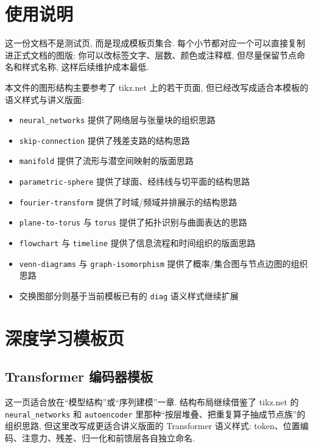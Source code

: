 \documentclass[a4paper,12pt,oneside]{maki-notes}
\begin{document}
\frontmatter
\MakeTitlePage

\chapter*{使用说明}
这一份文档不是测试页, 而是现成模板页集合. 每个小节都对应一个可以直接复制进正式文档的图版: 你可以改标签文字、层数、颜色或注释框, 但尽量保留节点命名和样式名称, 这样后续维护成本最低.

本文件的图形结构主要参考了 tikz.net 上的若干页面, 但已经改写成适合本模板的语义样式与讲义版面:
\begin{itemize}
\item \texttt{neural\_networks} 提供了网络层与张量块的组织思路
\item \texttt{skip-connection} 提供了残差支路的结构思路
\item \texttt{manifold} 提供了流形与潜空间映射的版面思路
\item \texttt{parametric-sphere} 提供了球面、经纬线与切平面的结构思路
\item \texttt{fourier-transform} 提供了时域/频域并排展示的结构思路
\item \texttt{plane-to-torus} 与 \texttt{torus} 提供了拓扑识别与曲面表达的思路
\item \texttt{flowchart} 与 \texttt{timeline} 提供了信息流程和时间组织的版面思路
\item \texttt{venn-diagrams} 与 \texttt{graph-isomorphism} 提供了概率/集合图与节点边图的组织思路
\item 交换图部分则基于当前模板已有的 \texttt{diag} 语义样式继续扩展
\end{itemize}

\tableofcontents

\mainmatter

\chapter{深度学习模板页}

\section{Transformer 编码器模板}

这一页适合放在“模型结构”或“序列建模”一章. 结构布局继续借鉴了 tikz.net 的 \texttt{neural\_networks} 和 \texttt{autoencoder} 里那种“按层堆叠、把重复算子抽成节点族”的组织思路, 但这里改写成更适合讲义版面的 Transformer 语义样式: token、位置编码、注意力、残差、归一化和前馈层各自独立命名.
\end{document}
